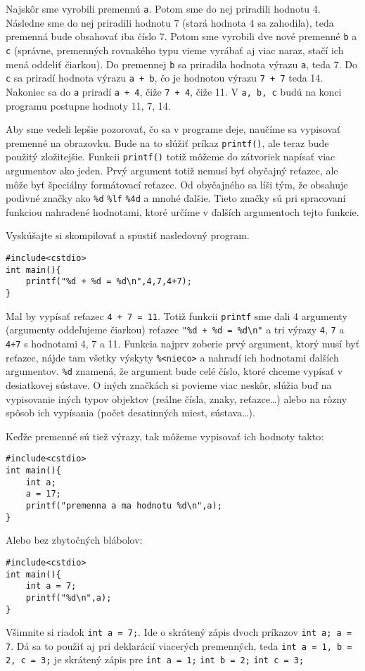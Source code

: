 \riesenie
Najskôr sme vyrobili premennú \verb!a!. Potom sme do nej priradili hodnotu 4.
Následne sme do nej priradili hodnotu 7 (stará hodnota 4 sa zahodila), teda
premenná bude obsahovať iba číslo 7. Potom sme vyrobili dve nové premenné
\verb!b!  a \verb!c! (správne, premenných rovnakého typu vieme vyrábať aj viac
naraz, stačí ich mená oddeliť čiarkou).  Do premennej \verb!b! sa priradila
hodnota výrazu \verb!a!, teda 7. Do \verb!c! sa priradí hodnota výrazu 
\verb!a + b!, čo je hodnotou výrazu \verb!7 + 7! teda 14. Nakoniec sa do
\verb!a!  priradí \verb!a + 4!, čiže \verb!7 + 4!, čiže 11. V \verb!a, b, c!
budú na konci programu postupne hodnoty 11, 7, 14.

\medskip

Aby sme vedeli lepšie pozorovať, čo sa v programe deje, naučíme sa vypisovať
premenné na obrazovku. Bude na to slúžiť príkaz \verb!printf()!, ale teraz bude
použitý zložitejšie. Funkcii \verb!printf()! totiž môžeme do zátvoriek napísať
viac argumentov ako jeden. Prvý argument totiž nemusí byť obyčajný reťazec,
ale môže byť špeciálny formátovací reťazec. Od obyčajného sa líši tým, že
obsahuje podivné značky ako \verb!%d! \verb!%lf! \verb!%4d! a mnohé ďalšie.
Tieto značky sú pri spracovaní funkciou nahradené hodnotami, ktoré určíme v
ďalších argumentoch tejto funkcie.

Vyskúšajte si skompilovať a spustiť nasledovný program.
\begin{lstlisting}
#include<cstdio>
int main(){
    printf("%d + %d = %d\n",4,7,4+7);
}
\end{lstlisting}
Mal by vypísať reťazec \verb!4 + 7 = 11!. Totiž funkcii \verb!printf! sme dali
4 argumenty (argumenty oddeľujeme čiarkou) reťazec \verb!"%d + %d = %d\n"! a
tri výrazy \verb!4!, \verb!7! a \verb!4+7! s hodnotami 4, 7 a 11.  Funkcia najprv
zoberie prvý argument, ktorý musí byť reťazec, nájde tam všetky výskyty
\verb!%<nieco>! a nahradí ich hodnotami ďalších argumentov.  \verb!%d! znamená,
že argument bude celé číslo, ktoré chceme vypísať v desiatkovej sústave. O
iných značkách si povieme viac neskôr, slúžia buď na vypisovanie iných typov
objektov (reálne čísla, znaky, reťazce\dots) alebo na rôzny spôsob ich
vypísania (počet desatinných miest, sústava\dots).

Keďže premenné sú tiež výrazy, tak môžeme vypisovať ich hodnoty takto:
\begin{lstlisting}
#include<cstdio>
int main(){
    int a;
    a = 17;
    printf("premenna a ma hodnotu %d\n",a);
}
\end{lstlisting}
Alebo bez zbytočných blábolov:
\begin{lstlisting}
#include<cstdio>
int main(){
    int a = 7;
    printf("%d\n",a);
}
\end{lstlisting}
Všimnite si riadok \verb!int a = 7;!. Ide o skrátený zápis dvoch príkazov
\verb!int a; a = 7!. Dá sa to použiť aj pri deklarácií viacerých premenných,
teda \verb!int a = 1, b = 2, c = 3;! je skrátený zápis pre \verb!int a = 1;!
\verb!int b = 2;! \verb!int c = 3;!

